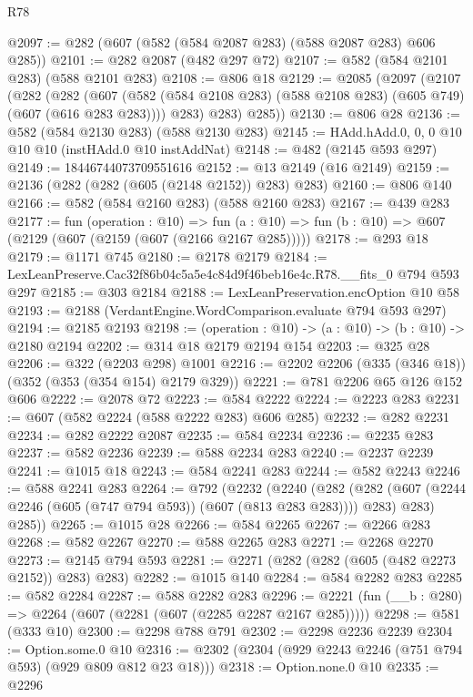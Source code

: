 \begin{lexlean}{R78}
\begin{coremodule}
@2097 := @282 (@607 (@582 (@584 @2087 @283) (@588 @2087 @283) @606 @285))
@2101 := @282 @2087 (@482 @297 @72)
@2107 := @582 (@584 @2101 @283) (@588 @2101 @283)
@2108 := @806 @18
@2129 := @2085
    (@2097
      (@2107
        (@282
          (@282
            (@607 (@582 (@584 @2108 @283) (@588 @2108 @283) (@605 @749) (@607 (@616 @283 @283))))
            @283)
          @283)
        @285))
@2130 := @806 @28
@2136 := @582 (@584 @2130 @283) (@588 @2130 @283)
@2145 := HAdd.hAdd.{0, 0, 0} @10 @10 @10 (instHAdd.{0} @10 instAddNat)
@2148 := @482 (@2145 @593 @297)
@2149 := 18446744073709551616
@2152 := @13 @2149 (@16 @2149)
@2159 := @2136 (@282 (@282 (@605 (@2148 @2152)) @283) @283)
@2160 := @806 @140
@2166 := @582 (@584 @2160 @283) (@588 @2160 @283)
@2167 := @439 @283
@2177 := fun (operation : @10) =>
  fun (a : @10) => fun (b : @10) => @607 (@2129 (@607 (@2159 (@607 (@2166 @2167 @285)))))
@2178 := @293 @18
@2179 := @1171 @745
@2180 := @2178 @2179
@2184 := LexLeanPreserve.Cac32f86b04c5a5e4c84d9f46beb16e4c.R78.__fits_0 @794 @593 @297
@2185 := @303 @2184
@2188 := LexLeanPreservation.encOption @10 @58
@2193 := @2188 (VerdantEngine.WordComparison.evaluate @794 @593 @297)
@2194 := @2185 @2193
@2198 := (operation : @10) -> (a : @10) -> (b : @10) -> @2180 @2194
@2202 := @314 @18 @2179 @2194 @154
@2203 := @325 @28
@2206 := @322 (@2203 @298) @1001
@2216 := @2202 @2206 (@335 (@346 @18)) (@352 (@353 (@354 @154) @2179 @329))
@2221 := @781 @2206 @65 @126 @152 @606
@2222 := @2078 @72
@2223 := @584 @2222
@2224 := @2223 @283
@2231 := @607 (@582 @2224 (@588 @2222 @283) @606 @285)
@2232 := @282 @2231
@2234 := @282 @2222 @2087
@2235 := @584 @2234
@2236 := @2235 @283
@2237 := @582 @2236
@2239 := @588 @2234 @283
@2240 := @2237 @2239
@2241 := @1015 @18
@2243 := @584 @2241 @283
@2244 := @582 @2243
@2246 := @588 @2241 @283
@2264 := @792
    (@2232
      (@2240
        (@282 (@282 (@607 (@2244 @2246 (@605 (@747 @794 @593)) (@607 (@813 @283 @283)))) @283) @283)
        @285))
@2265 := @1015 @28
@2266 := @584 @2265
@2267 := @2266 @283
@2268 := @582 @2267
@2270 := @588 @2265 @283
@2271 := @2268 @2270
@2273 := @2145 @794 @593
@2281 := @2271 (@282 (@282 (@605 (@482 @2273 @2152)) @283) @283)
@2282 := @1015 @140
@2284 := @584 @2282 @283
@2285 := @582 @2284
@2287 := @588 @2282 @283
@2296 := @2221 (fun (__b : @280) => @2264 (@607 (@2281 (@607 (@2285 @2287 @2167 @285)))))
@2298 := @581 (@333 @10)
@2300 := @2298 @788 @791
@2302 := @2298 @2236 @2239
@2304 := Option.some.{0} @10
@2316 := @2302 (@2304 (@929 @2243 @2246 (@751 @794 @593) (@929 @809 @812 @23 @18)))
@2318 := Option.none.{0} @10
@2335 := @2296

\end{coremodule}
\end{lexlean}

